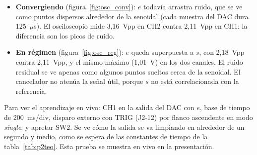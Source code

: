 \documentclass[11pt,a4paper]{article}
\begin{document}
\begin{itemize}
  \item \textbf{Convergiendo} (figura~\ref{fig:osc_conv}): $e$ todavía arrastra ruido, que se ve
  como puntos dispersos alrededor de la senoidal (cada muestra del DAC dura 125~$\mu$s). El
  osciloscopio mide 3,16~Vpp en CH2 contra 2,11~Vpp en CH1: la diferencia son los picos de ruido.
  \item \textbf{En régimen} (figura~\ref{fig:osc_reg}): $e$ queda superpuesta a $s$, con 2,18~Vpp
  contra 2,11~Vpp, y el mismo máximo (1,01~V) en los dos canales. El ruido residual se ve apenas
  como algunos puntos sueltos cerca de la senoidal. El cancelador no atenúa la señal útil, porque
  $s$ no está correlacionada con la referencia.
\end{itemize}

Para ver el aprendizaje en vivo: CH1 en la salida del DAC con $e$, base de tiempo de 200~ms/div,
disparo externo con TRIG (J2-12) por flanco ascendente en modo \emph{single}, y apretar SW2. Se ve
cómo la salida se va limpiando en alrededor de un segundo y medio, como se espera de las
constantes de tiempo de la tabla~\ref{tab:p2teo}. Esta prueba se muestra en vivo en la
presentación.

\end{document}
